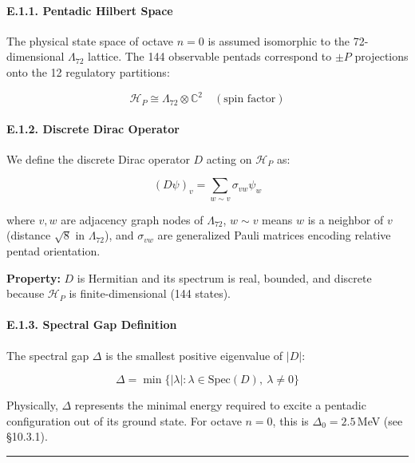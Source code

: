 \documentclass[11pt]{article}
\let\oldmathcal\mathcal
\renewcommand{\mathcal}[1]{\oldmathcal{#1}}
\begin{document}
\hypertarget{e.1.1.-pentadic-hilbert-space}{%
\paragraph{E.1.1. Pentadic Hilbert
Space}\label{e.1.1.-pentadic-hilbert-space}}

The physical state space of octave \(n=0\) is assumed isomorphic to the
72-dimensional \(\Lambda_{72}\) lattice. The 144 observable pentads
correspond to \(\pm P\) projections onto the 12 regulatory partitions:

\[
\mathcal{H}_P \cong \Lambda_{72} \otimes \mathbb{C}^2 \quad (\text{spin factor})
\]

\hypertarget{e.1.2.-discrete-dirac-operator}{%
\paragraph{E.1.2. Discrete Dirac
Operator}\label{e.1.2.-discrete-dirac-operator}}

We define the discrete Dirac operator \(D\) acting on \(\mathcal{H}_P\)
as:

\[
(D\psi)_v = \sum_{w \sim v} \sigma_{vw} \psi_w
\]

where \(v, w\) are adjacency graph nodes of \(\Lambda_{72}\),
\(w \sim v\) means \(w\) is a neighbor of \(v\) (distance \(\sqrt{8}\)
in \(\Lambda_{72}\)), and \(\sigma_{vw}\) are generalized Pauli matrices
encoding relative pentad orientation.

\textbf{Property:} \(D\) is Hermitian and its spectrum is real, bounded,
and discrete because \(\mathcal{H}_P\) is finite-dimensional (144
states).

\hypertarget{e.1.3.-spectral-gap-definition}{%
\paragraph{E.1.3. Spectral Gap
Definition}\label{e.1.3.-spectral-gap-definition}}

The spectral gap \(\Delta\) is the smallest positive eigenvalue of
\(|D|\):

\[
\Delta = \min\{ |\lambda| : \lambda \in \text{Spec}(D),\ \lambda \neq 0 \}
\]

Physically, \(\Delta\) represents the minimal energy required to excite
a pentadic configuration out of its ground state. For octave \(n=0\),
this is \(\Delta_0 = 2.5\)\,MeV (see §10.3.1).

\begin{center}\rule{0.5\linewidth}{0.5pt}\end{center}
\end{document}
